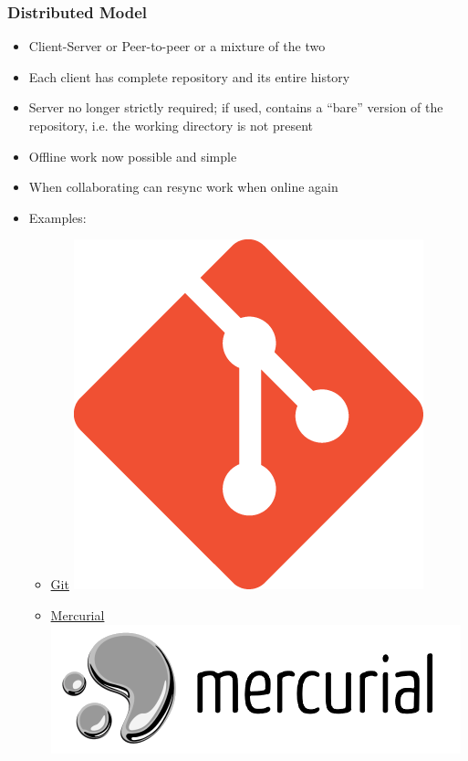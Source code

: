 \documentclass{git_course}
\begin{document}
\begin{frame}
\frametitle{Distributed Model}
\begin{itemize}
    \item Client-Server or Peer-to-peer or a mixture of the two
    \item Each client has complete repository and its entire history
    \item Server no longer strictly required; if used, contains a ``bare''
        version of the repository, i.e. the working directory is not present
    \item Offline work now possible and simple
    \item When collaborating can resync work when online again
    \item Examples:
        \begin{itemize}
            \item \href{https://git-scm.com/}{Git}
                \includegraphics[height=0.05\textheight]{images/git_logo.png}
            \item \href{https://www.mercurial-scm.org/}{Mercurial}
                \includegraphics[height=0.05\textheight]{images/mercurial_logo.png}
        \end{itemize}
\end{itemize}
\end{frame}
\end{document}

